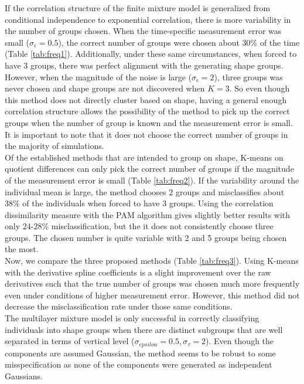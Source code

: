 If the correlation structure of the finite mixture model is generalized from conditional independence to exponential correlation, there is more variability in the number of groups chosen. When the time-specific measurement error was small ($\sigma_{\epsilon}=0.5$), the correct number of groups were chosen about 30\% of the time (Table \ref{tab:freq1}). Additionally, under these same circumstances, when forced to have 3 groups, there was perfect alignment with the generating shape groups. However, when the magnitude of the noise is large ($\sigma_{\epsilon}=2$), three groups was never chosen and shape groups are not discovered when $K=3$. So even though this method does not directly cluster based on shape, having a general enough correlation structure allows  the possibility of the method to pick up the correct groups when the number of group is known and the measurement error is small. It is important to note that it does not choose the correct number of groups in the majority of simulations. \\

Of the established methods that are intended to group on shape, K-means on quotient differences can only pick the correct number of groups if the magnitude of the measurement error is small (Table \ref{tab:freq2}). If the variability around the individual mean is large, the method chooses 2 groups and misclassifies about 38\% of the individuals when forced to have 3 groups. Using the correlation dissimilarity measure with the PAM algorithm gives slightly better results with only 24-28\% misclassification, but the it does not consistently choose three groups. The chosen number is quite variable with 2 and 5 groups being chosen the most.\\

Now, we compare the three proposed methods (Table \ref{tab:freq3}). Using K-means with the derivative spline coefficients is a slight improvement over the raw derivatives such that the true number of groups was chosen much more frequently even under conditions of higher measurement error. However, this method did not decrease the misclassification rate under those same conditions. \\

The multilayer mixture model is only successful in correctly classifying individuals into shape groups when there are distinct subgroups that are well separated in terms of vertical level ($\sigma_{epsilon}=0.5, \sigma_{\tau}=2$). Even though the components are assumed Gaussian, the method seems to be robust to some misspecification as none of the components were generated as independent Gaussians. \\

